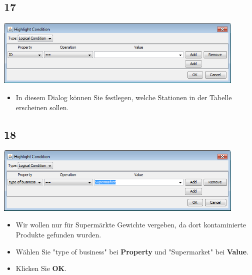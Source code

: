 \documentclass{beamer}
\begin{document}
\subsection{17}
\begin{frame}
	\begin{center}
  		\includegraphics[width=0.9\textwidth]{17.png}
	\end{center}
	\begin{itemize}
		\item In diesem Dialog können Sie festlegen, welche Stationen in der Tabelle erscheinen sollen.
	\end{itemize}
\end{frame}

\subsection{18}
\begin{frame}
	\begin{center}
  		\includegraphics[width=0.9\textwidth]{18.png}
	\end{center}
	\begin{itemize}
		\item Wir wollen nur für Supermärkte Gewichte vergeben, da dort kontaminierte Produkte gefunden wurden.
		\item Wählen Sie "type of business" bei \textbf{Property} und "Supermarket" bei \textbf{Value}.
		\item Klicken Sie \textbf{OK}.
	\end{itemize}
\end{frame}
\end{document}
